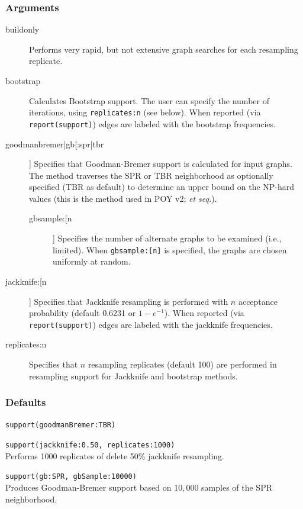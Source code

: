 	\subsubsection{Arguments}
		\begin{description}
			\item[buildonly] Performs very rapid, but not extensive graph searches for each 
			resampling replicate.
		
			\item[bootstrap] Calculates Bootstrap support. The user can specify the number of 
			iterations, using \texttt{replicates:n} (see below). When reported (via \texttt{report(support)}) 
			edges are labeled with the bootstrap frequencies.
		
			\item[goodmanbremer|gb[:spr|tbr]] Specifies that Goodman-Bremer support is 
			calculated for input graphs. The method traverses the SPR or TBR neighborhood 
			as optionally specified (TBR as default) to determine an upper bound on the NP-hard 
			values (this is the method used in POY v2; \citealp{POY2} \textit{et seq.}).
			
			\begin{description}
			\item[gbsample:[n]] Specifies the number of alternate graphs to be examined (i.e., limited). 
			When \texttt{gbsample:[n]} is specified, the graphs are chosen uniformly at random.
			\end{description}
		
			\item[jackknife:[n]] Specifies that Jackknife resampling is performed with $n$ acceptance 
			probability (default 0.6231 or $1 - e^{-1}$). When reported (via \texttt{report(support)}) 
			edges are labeled with the jackknife frequencies.
		
			\item[replicates:n] Specifies that $n$ resampling replicates (default 100) are performed 
			in resampling support for Jackknife and bootstrap methods.
		\end{description}	
		\subsubsection{Defaults}
			\texttt{support(goodmanBremer:TBR)}
		

		\begin{example}
			\item{\texttt{support(jackknife:0.50, replicates:1000)}\\Performs 1000 replicates of 
			delete 50\% jackknife resampling.}
				
			\item{\texttt{support(gb:SPR, gbSample:10000)}\\Produces Goodman-Bremer 
			support based on $10,000$ samples of the SPR neighborhood.}
		\end{example}

